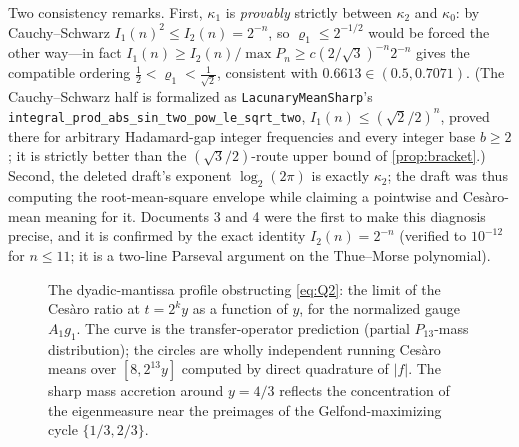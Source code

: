 \documentclass[11pt,oneside]{article}
\theoremstyle{definition}
\theoremstyle{remark}
\newcommand{\lean}[1]{%
  \ifmmode\text{\nolinkurl{#1}}\else\nolinkurl{#1}\fi}
\begin{document}
Two consistency remarks.  First, $\kappa_1$ is \emph{provably} strictly
between $\kappa_2$ and $\kappa_0$: by Cauchy--Schwarz
$I_1(n)^2\le I_2(n)=2^{-n}$, so $\varrho_1\le2^{-1/2}$ would be forced the
other way---in fact $I_1(n)\ge I_2(n)/\max P_n\ge c(2/\sqrt3)^{-n}2^{-n}$
gives the compatible ordering
$\tfrac12<\varrho_1<\tfrac{1}{\sqrt2}$, consistent with
$0.6613\in(0.5,0.7071)$.  (The Cauchy--Schwarz half is formalized as
\lean{LacunaryMeanSharp}'s
\lean{integral\_prod\_abs\_sin\_two\_pow\_le\_sqrt\_two},
$I_1(n)\le(\sqrt2/2)^n$, proved there for arbitrary Hadamard-gap integer
frequencies and every integer base $b\ge2$; it is strictly better than the
$(\sqrt3/2)$-route upper bound of \cref{prop:bracket}.)  Second, the deleted draft's exponent
$\log_2(2\pi)$ is exactly $\kappa_2$; the draft was thus computing the
root-mean-square envelope while claiming a pointwise and Ces\`aro-mean
meaning for it.  Documents 3 and 4 were the first to make this diagnosis
precise, and it is confirmed by the exact identity
$I_2(n)=2^{-n}$ (verified to $10^{-12}$ for $n\le11$; it is a two-line
Parseval argument on the Thue--Morse polynomial).

\begin{figure}[ht]
\centering
{}
\caption{The dyadic-mantissa profile obstructing \eqref{eq:Q2}: the limit
of the Ces\`aro ratio at $t=2^ky$ as a function of $y$, for the normalized
gauge $A_1g_1$.  The curve is the transfer-operator prediction (partial
$P_{13}$-mass distribution); the circles are wholly independent running
Ces\`aro means over $[8,2^{13}y]$ computed by direct quadrature of $|f|$.
The sharp mass accretion around $y=4/3$ reflects the concentration of
the eigenmeasure near the preimages of the Gelfond-maximizing cycle
$\{1/3,2/3\}$.}
\label{fig:profile}
\end{figure}
\end{document}

